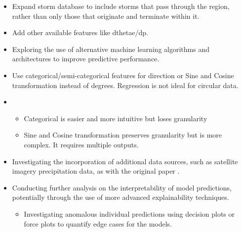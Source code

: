 \begin{itemize}
    \item Expand storm database to include storms that pass through the region, rather than only those that originate and terminate within it.
    \item Add other available features like dthetae/dp.
    \item Exploring the use of alternative machine learning algorithms and architectures to improve predictive performance.
    \item Use categorical/semi-categorical features for direction or Sine and Cosine transformation instead of degrees. Regression is not ideal for circular data.
    \item \begin{itemize}
        \item Categorical is easier and more intuitive but loses granularity
        \item Sine and Cosine transformation preserves granularity but is more complex. It requires multiple outputs.
    \end{itemize}
    \item Investigating the incorporation of additional data sources, such as satellite imagery precipitation data, as with the original paper \citep{Hill2023}.
    \item Conducting further analysis on the interpretability of model predictions, potentially through the use of more advanced explainability techniques.
    \begin{itemize}
        \item Investigating anomalous individual predictions using decision plots or force plots to quantify edge cases for the models.
    \end{itemize}
\end{itemize}